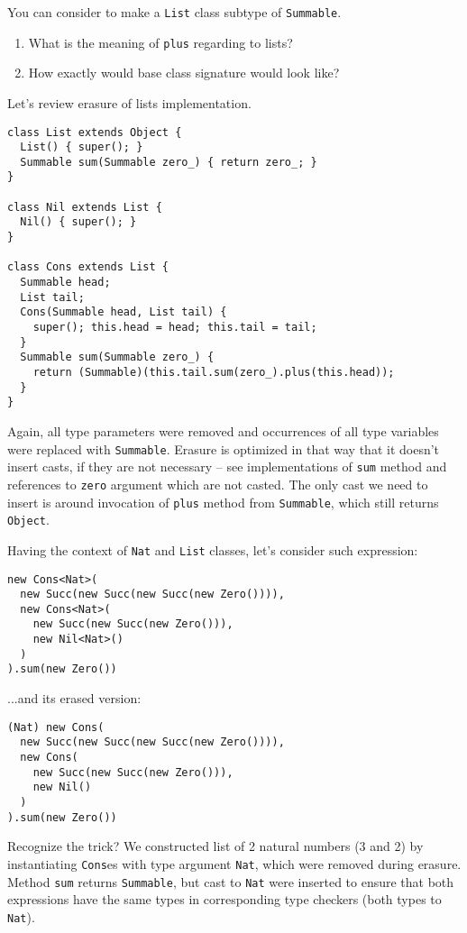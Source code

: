 \documentclass{article}[12pt]
\begin{document}
You can consider to make a \texttt{List} class subtype of \texttt{Summable}.
\begin{enumerate}
\item What is the meaning of \texttt{plus} regarding to lists?
\item How exactly would base class signature would look like?
\end{enumerate}

Let's review erasure of lists implementation.

\begin{verbatim}
class List extends Object {
  List() { super(); }
  Summable sum(Summable zero_) { return zero_; }
}

class Nil extends List {
  Nil() { super(); }
}

class Cons extends List {
  Summable head;
  List tail;
  Cons(Summable head, List tail) {
    super(); this.head = head; this.tail = tail;
  }
  Summable sum(Summable zero_) {
    return (Summable)(this.tail.sum(zero_).plus(this.head));
  }
}
\end{verbatim}

Again, all type parameters were removed and occurrences of all type variables were replaced with \texttt{Summable}. Erasure is optimized in that way that it doesn't insert casts, if they are not necessary -- see implementations of \texttt{sum} method and references to \texttt{zero} argument which are not casted. The only cast we need to insert is around invocation of \texttt{plus} method from \texttt{Summable}, which still returns \texttt{Object}.

Having the context of \texttt{Nat} and \texttt{List} classes, let's consider such expression:

\begin{verbatim}
new Cons<Nat>(
  new Succ(new Succ(new Succ(new Zero()))),
  new Cons<Nat>(
    new Succ(new Succ(new Zero())),
    new Nil<Nat>()
  )
).sum(new Zero())
\end{verbatim}
...and its erased version:
\begin{verbatim}
(Nat) new Cons(
  new Succ(new Succ(new Succ(new Zero()))),
  new Cons(
    new Succ(new Succ(new Zero())),
    new Nil()
  )
).sum(new Zero())
\end{verbatim}

Recognize the trick? We constructed list of 2 natural numbers (3 and 2) by instantiating \texttt{Cons}es with type argument \texttt{Nat}, which were removed during erasure. Method \texttt{sum} returns \texttt{Summable}, but cast to \texttt{Nat} were inserted to ensure that both expressions have the same types in corresponding type checkers (both types to \texttt{Nat}).
\end{document}
